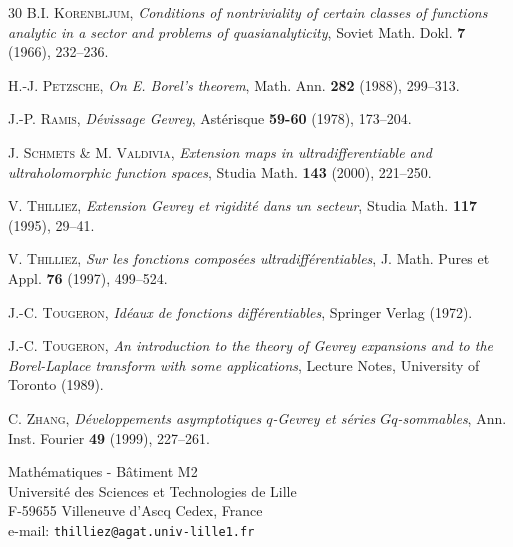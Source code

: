 \documentclass[a4paper]{amsart}
\theoremstyle{plain}
\theoremstyle{definition}
\theoremstyle{remark}
\begin{document}
\begin{thebibliography}{30}
 \textsc{B.I. Korenbljum}, \textit{Conditions of nontriviality of certain
classes of functions analytic in a sector and problems of quasianalyticity}, Soviet Math. Dokl. \textbf{7} (1966), 232--236.

 \textsc{H.-J. Petzsche}, \textit{On E. Borel's theorem}, Math. Ann.  \textbf{282} (1988), 299--313.

 \textsc{J.-P. Ramis}, \textit{D\'evissage Gevrey}, Ast\'erisque \textbf{59-60} (1978), 173--204.

 \textsc{J. Schmets \& M. Valdivia}, \textit{Extension maps in ultradifferentiable and ultraholomorphic function spaces}, Studia Math. \textbf{143} (2000), 221--250.

 \textsc{V. Thilliez}, \textit{Extension Gevrey et rigidit\'e dans un secteur}, Studia Math. \textbf{117} (1995), 29--41.

 \textsc{V. Thilliez}, \textit{Sur les fonctions compos\'ees ultradiff\'erentiables}, J. Math. Pures et Appl. \textbf{76} (1997), 499--524.

 \textsc{J.-C. Tougeron}, \textit{Id\'eaux de fonctions diff\'erentiables}, Springer Verlag (1972).

 \textsc{J.-C. Tougeron}, \textit{An introduction to the theory of Gevrey expansions and to the Borel-Laplace transform with some applications}, Lecture Notes, University of Toronto (1989).

 \textsc{C. Zhang}, \textit{D\'eveloppements asymptotiques $ q $-Gevrey et s\'eries $ Gq $-sommables}, Ann. Inst. Fourier \textbf{49} (1999), 227--261.

\end{thebibliography}

\begin{flushleft}
Math\'ematiques - B\^atiment M2\\
Universit\'e des Sciences et Technologies de Lille\\
F-59655 Villeneuve d'Ascq Cedex, France\\
e-mail: \texttt{thilliez@agat.univ-lille1.fr}
\end{flushleft}
\end{document}
